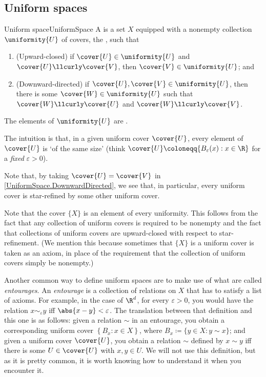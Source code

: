 \subsection{Uniform spaces}

\begin{dfn}{Uniform space}{UniformSpace}
A  is a set $X$ equipped with a nonempty collection $\uniformity{U}$ of covers, the , such that
\begin{enumerate}
\item \label{UniformSpace.UpwardClosed}(Upward-closed) if $\cover{U}\in \uniformity{U}$ and $\cover{U}\llcurly \cover{V}$, then $\cover{V}\in \uniformity{U}$; and
\item \label{UniformSpace.DownwardDirected}(Downward-directed) if $\cover{U},\cover{V}\in \uniformity{U}$, then there is some $\cover{W}\in \uniformity{U}$ such that $\cover{W}\llcurly \cover{U}$ and $\cover{W}\llcurly \cover{V}$.
\end{enumerate}
\begin{rmk}
The elements of $\uniformity{U}$ are .
\end{rmk}
\begin{rmk}
The intuition is that, in a given uniform cover $\cover{U}$, every element of $\cover{U}$ is `of the same size' (think $\cover{U}\coloneqq \{ B_{\varepsilon}(x):x\in \R \}$ for a \emph{fixed} $\varepsilon >0$).
\end{rmk}
\begin{rmk}
Note that, by taking $\cover{U}=\cover{V}$ in \cref{UniformSpace.DownwardDirected}, we see that, in particular, every uniform cover is star-refined by some other uniform cover.
\end{rmk}
\begin{rmk}
Note that the cover $\{ X\}$ is an element of every uniformity.  This follows from the fact that any collection of uniform covers is required to be nonempty and the fact that collections of uniform covers are upward-closed with respect to star-refinement.  (We mention this because sometimes that $\{ X\}$ is a uniform cover is taken as an axiom, in place of the requirement that the collection of uniform covers simply be nonempty.)
\end{rmk}
\begin{rmk}
Another common way to define uniform spaces are to make use of what are called \emph{entourages}.  An \emph{entourage} is a collection of relations on $X$ that has to satisfy a list of axioms.  For example, in the case of $\R ^d$, for every $\varepsilon >0$, you would have the relation $x\sim _{\varepsilon}y$ iff $\abs{x-y}<\varepsilon$.  The translation between that definition and this one is as follows:  given a relation $\sim$ in an entourage, you obtain a corresponding uniform cover $\left\{ B_x:x\in X\right\}$, where $B_x\coloneqq \{ y\in X:y\sim x\}$; and given a uniform cover $\cover{U}$, you obtain a relation $\sim$ defined by $x\sim y$ iff there is some $U\in \cover{U}$ with $x,y\in U$.  We will not use this definition, but as it is pretty common, it is worth knowing how to understand it when you encounter it.

\end{rmk}
\end{dfn}
